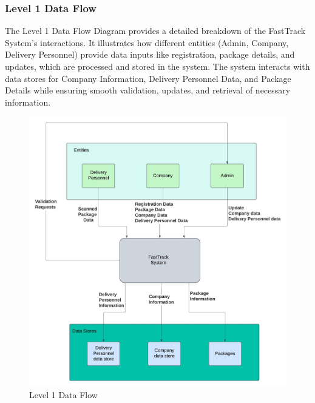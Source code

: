 \subsubsection{Level 1 Data Flow}
The Level 1 Data Flow Diagram provides a detailed breakdown of the FastTrack System's interactions. It illustrates how different entities (Admin, Company, Delivery Personnel) provide data inputs like registration, package details, and updates, which are processed and stored in the system. The system interacts with data stores for Company Information, Delivery Personnel Data, and Package Details while ensuring smooth validation, updates, and retrieval of necessary information.
\begin{figure}[H]  %
\centering
    \includegraphics[scale=0.5]{Level 1 Data Flow.jpeg}
    \caption{Level 1 Data Flow}
    \label{fig:level1_data_flow}  %
\end{figure}
\newpage
